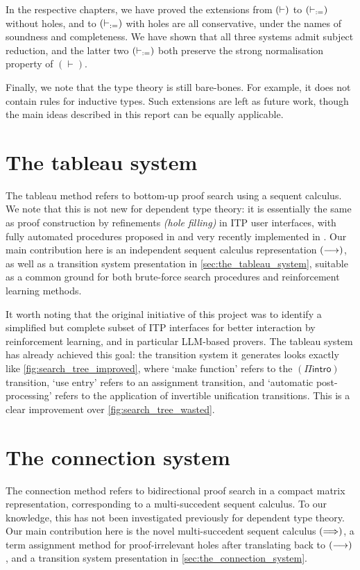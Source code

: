 \documentclass[twoside]{report}
\begin{document}
In the respective chapters, we have proved the extensions from $(\vdash)$ to $(\vdash_{:=})$ without holes, and to $(\vdash_{:=})$ with holes are all conservative, under the names of soundness and completeness. We have shown that all three systems admit subject reduction, and the latter two $(\vdash_{:=})$ both preserve the strong normalisation property of $(\vdash)$.

Finally, we note that the type theory is still bare-bones. For example, it does not contain rules for inductive types. Such extensions are left as future work, though the main ideas described in this report can be equally applicable.

\section{The tableau system}
\label{sec:evaluation_tableau_system}

The tableau method refers to bottom-up proof search using a sequent calculus. We note that this is not new for dependent type theory: it is essentially the same as proof construction by refinements \emph{(hole filling)} in ITP user interfaces, with fully automated procedures proposed in \cite{pym1990proofs,dowek1993complete} and very recently implemented in \cite{norman2025canonical}. Our main contribution here is an independent sequent calculus representation $(\longrightarrow)$, as well as a transition system presentation in \cref{sec:the_tableau_system}, suitable as a common ground for both brute-force search procedures and reinforcement learning methods.

It worth noting that the original initiative of this project was to identify a simplified but complete subset of ITP interfaces for better interaction by reinforcement learning, and in particular LLM-based provers. The tableau system has already achieved this goal: the transition system it generates looks exactly like \cref{fig:search_tree_improved}, where `make function' refers to the $(\Pi\mathsf{intro})$ transition, `use entry' refers to an assignment transition, and `automatic post-processing' refers to the application of invertible unification transitions. This is a clear improvement over \cref{fig:search_tree_wasted}.

\section{The connection system}
\label{sec:evaluation_connection_system}

The connection method refers to bidirectional proof search in a compact matrix representation, corresponding to a multi-succedent sequent calculus. To our knowledge, this has not been investigated previously for dependent type theory. Our main contribution here is the novel multi-succedent sequent calculus $(\Longrightarrow)$, a term assignment method for proof-irrelevant holes after translating back to $(\longrightarrow)$, and a transition system presentation in \cref{sec:the_connection_system}.
\end{document}
